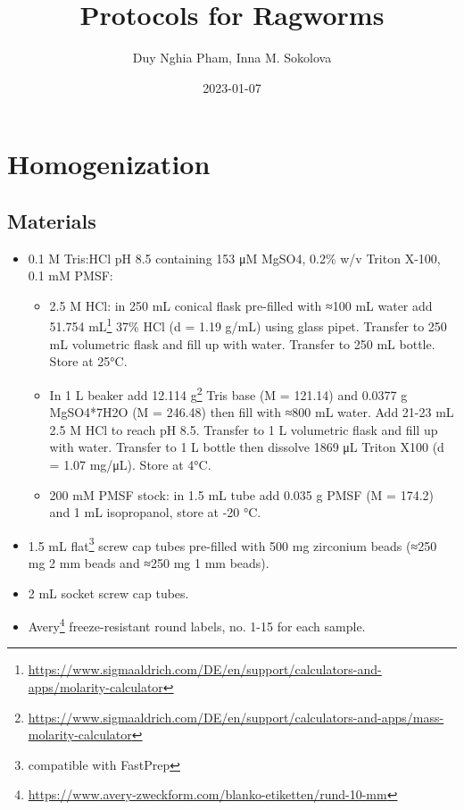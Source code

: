 \documentclass[
]{book}
\title{Protocols for Ragworms}
\author{Duy Nghia Pham, Inna M. Sokolova}
\date{2023-01-07}
\begin{document}
\maketitle

{
\setcounter{tocdepth}{1}
\tableofcontents
}
\hypertarget{homogenization}{%
\chapter{Homogenization}\label{homogenization}}

\hypertarget{materials}{%
\section{Materials}\label{materials}}

\begin{itemize}
\item
  0.1 M Tris:HCl pH 8.5 containing 153 μM MgSO4, 0.2\% w/v Triton X-100, 0.1 mM PMSF:

  \begin{itemize}
  \item
    2.5 M HCl: in 250 mL conical flask pre-filled with ≈100 mL water add 51.754 mL\footnote{\url{https://www.sigmaaldrich.com/DE/en/support/calculators-and-apps/molarity-calculator}} 37\% HCl (d = 1.19 g/mL) using glass pipet. Transfer to 250 mL volumetric flask and fill up with water. Transfer to 250 mL bottle. Store at 25°C.
  \item
    In 1 L beaker add 12.114 g\footnote{\url{https://www.sigmaaldrich.com/DE/en/support/calculators-and-apps/mass-molarity-calculator}} Tris base (M = 121.14) and 0.0377 g MgSO4*7H2O (M = 246.48) then fill with ≈800 mL water. Add 21-23 mL 2.5 M HCl to reach pH 8.5. Transfer to 1 L volumetric flask and fill up with water. Transfer to 1 L bottle then dissolve 1869 μL Triton X100 (d = 1.07 mg/μL). Store at 4°C.
  \item
    200 mM PMSF stock: in 1.5 mL tube add 0.035 g PMSF (M = 174.2) and 1 mL isopropanol, store at -20 °C.
  \end{itemize}
\item
  1.5 mL flat\footnote{compatible with FastPrep} screw cap tubes pre-filled with 500 mg zirconium beads (≈250 mg 2 mm beads and ≈250 mg 1 mm beads).
\item
  2 mL socket screw cap tubes.
\item
  Avery\footnote{\url{https://www.avery-zweckform.com/blanko-etiketten/rund-10-mm}} freeze-resistant round labels, no. 1-15 for each sample.
\end{itemize}
\end{document}
